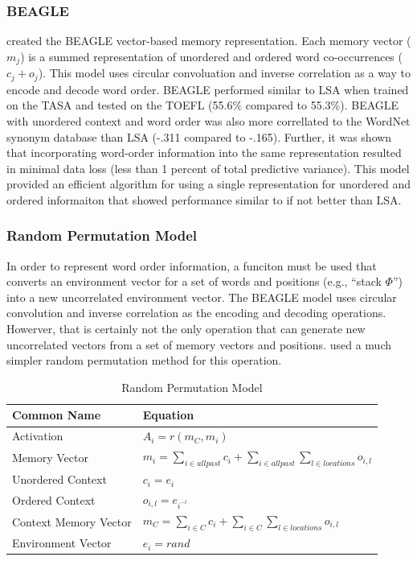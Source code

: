 \documentclass[man,floatsintext]{apa6}
\begin{document}
\subsubsection{BEAGLE}

\textcite{Jones2007} created the BEAGLE vector-based memory representation.
Each memory vector ($m_{j}$) is a summed representation of unordered and ordered word co-occurrences ($c_{j} + o_{j}$).
This model uses circular convoluation and inverse correlation as a way to encode and decode word order.
BEAGLE performed similar to LSA when trained on the TASA and tested on the TOEFL (55.6\% compared to 55.3\%).
BEAGLE with unordered context and word order was also more correllated to the WordNet synonym database than LSA (-.311 compared to -.165).
Further, it was shown that incorporating word-order information into the same representation resulted in minimal data loss (less than 1 percent of total predictive variance).
This model provided an efficient algorithm for using a single representation for unordered and ordered informaiton that showed performance similar to if not better than LSA.

\subsubsection{Random Permutation Model}

In order to represent word order information, a funciton must be used that converts an environment vector for a set of words and positions (e.g., ``stack $\Phi$'') into a new uncorrelated environment vector.
The BEAGLE model uses circular convolution and inverse correlation as the encoding and decoding operations.
Howerver, that is certainly not the only operation that can generate new uncorrelated vectors from a set of memory vectors and positions.
\textcite{Sahlgren2008} used a much simpler random permutation method for this operation.

\begin{table}[!ht]
  \caption{Random Permutation Model}
  \label{tabRandPermModel}
  {\tabulinesep=1.2mm
    \begin{tabu}{ll}
      \hline
      Common Name &  Equation \\
      \hline
      Activation &		$A_{i} = r(m_{C},m_{i})$ \\
      Memory Vector &		$m_{i} = \sum_{i \in all past} c_{i} + \sum_{i \in all past} \sum_{l \in locations} o_{i,l}$ \\
      Unordered Context &	$c_{i} = e_{i}$ \\
      Ordered Context &		$o_{i,l} = e_{i^{-l}}$ \\
      Context Memory Vector &	$m_{C} = \sum_{i \in C} c_{i} + \sum_{i \in C} \sum_{l \in locations} o_{i,l}$ \\
      Environment Vector & 	$e_{i} = rand$ \\
      \hline
    \end{tabu}
  }
\end{table}
\end{document}
